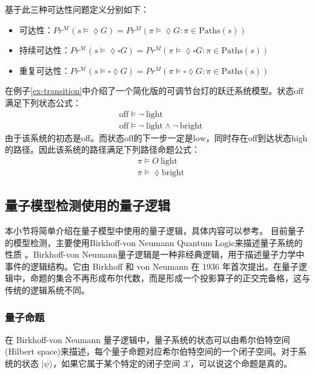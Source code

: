 基于此三种可达性问题定义分别如下：
\begin{itemize}
    \item 可达性：\( Pr^{\mathcal{M}}(s \models \lozenge G) = Pr^M(\pi \models \lozenge G : \pi \in \text{Paths}(s))\)
    \item 持续可达性：\( Pr^{\mathcal{M}}(s \models \lozenge \square G) = Pr^M(\pi \models \lozenge \square G : \pi \in \text{Paths}(s))\)
    \item 重复可达性：\( Pr^{\mathcal{M}}(s \models\square \lozenge G) = Pr^M(\pi \models \square\lozenge G : \pi \in \text{Paths}(s))\)
\end{itemize}
\begin{example}
    在例子\ref{ex-transition}中介绍了一个简化版的可调节台灯的跃迁系统模型。状态\(\text{off}\)满足下列状态公式：
    \begin{align}
        & \text{off} \models \lnot\ \text{light} \\
        & \text{off} \models \lnot\ \text{light} \land \lnot\ \text{bright}
    \end{align}
    由于该系统的初态是off。而状态\(\text{off}\)的下一步一定是\(\text{low}\)，同时存在off到达状态high的路径。因此该系统的路径满足下列路径命题公式：
    \begin{align}
        & \pi \models O\ \text{light} \\
        & \pi \models \lozenge \text{bright}
    \end{align}
    
\end{example}

\subsection{量子模型检测使用的量子逻辑}
本小节将简单介绍在量子模型中使用的量子逻辑，具体内容可以参考\citep{2021}。
目前量子的模型检测，主要使用Birkhoff-von Neumann Quantum Logic来描述量子系统的性质
。Birkhoff-von Neumann量子逻辑是一种非经典逻辑，用于描述量子力学中事件的逻辑结构。它由 Birkhoff 和 von Neumann 在 1936 年首次提出。在量子逻辑中，命题的集合不再形成布尔代数，而是形成一个投影算子的正交完备格，这与传统的逻辑系统不同。


\subsubsection*{量子命题}
\label{sec-logic}
在 Birkhoff-von Neumann 量子逻辑中，量子系统的状态可以由希尔伯特空间(Hilbert space)来描述，每个量子命题对应希尔伯特空间的一个闭子空间。对于系统的状态 \(|\psi\rangle\)，如果它属于某个特定的闭子空间 \( \mathcal{X} \)，可以说这个命题是真的。

